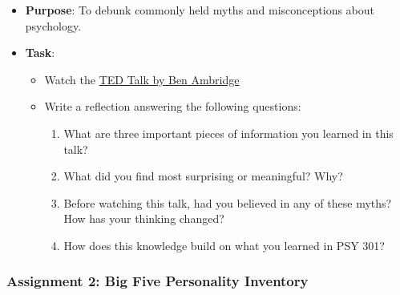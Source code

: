 \documentclass[
]{article}
\providecommand{\tightlist}{%
  \setlength{\itemsep}{0pt}\setlength{\parskip}{0pt}}
\begin{document}
\begin{itemize}
\tightlist
\item
  \textbf{Purpose}: To debunk commonly held myths and misconceptions about psychology.\\
\item
  \textbf{Task}:

  \begin{itemize}
  \tightlist
  \item
    Watch the \href{https://www.ted.com/talks/ben_ambridge_9_myths_about_psychology_debunked?subtitle=en}{TED Talk by Ben Ambridge}\\
  \item
    Write a reflection answering the following questions:

    \begin{enumerate}
    \def\labelenumi{\arabic{enumi}.}
    \tightlist
    \item
      What are three important pieces of information you learned in this talk?\\
    \item
      What did you find most surprising or meaningful? Why?\\
    \item
      Before watching this talk, had you believed in any of these myths? How has your thinking changed?\\
    \item
      How does this knowledge build on what you learned in PSY 301?
    \end{enumerate}
  \end{itemize}
\end{itemize}

\hypertarget{assignment-2-big-five-personality-inventory}{%
\subsubsection{Assignment 2: Big Five Personality Inventory}\label{assignment-2-big-five-personality-inventory}}
\end{document}
